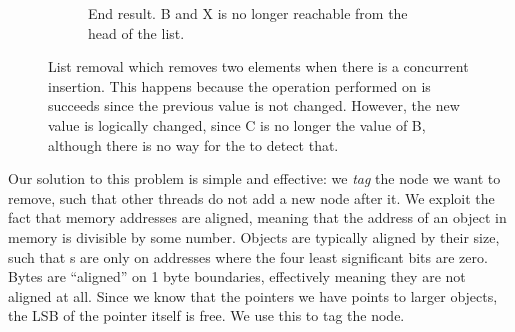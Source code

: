 \documentclass[b5paper]{report}
\begin{document}
\begin{figure}[ht]
  \begin{subfigure}[b]{\textwidth}
      \centering
      \caption{End result. B and X is no longer reachable from the head of the
        list.\label{fig:list-remove-b}}
  \end{subfigure}
  \caption{List removal which removes two elements when there is a concurrent
  insertion. This happens because the  operation
  performed on  is succeeds since the previous value is not
  changed.  However, the new value is logically changed, since C is no longer
  the  value of B, although there is no way for the  to
  detect that.\label{fig:list-remove}} \end{figure}

Our solution to this problem is simple and effective: we \emph{tag} the node we
want to remove, such that other threads do not add a new node after it. We
exploit the fact that memory addresses are aligned, meaning that the address of
an object in memory is divisible by some number. Objects are typically aligned
by their size, such that s are only on addresses where the four least
significant bits are zero. Bytes are ``aligned'' on 1 byte boundaries,
effectively meaning they are not aligned at all. Since we know that the pointers
we have points to larger objects, the LSB of the pointer itself is free. We use
this to tag the node.
\end{document}
